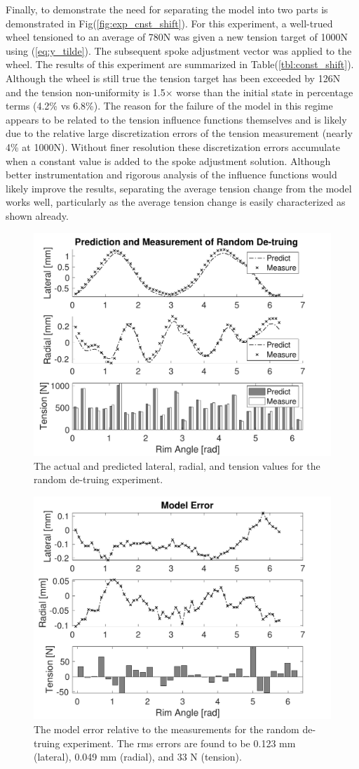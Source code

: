 \documentclass[journal]{IEEEtran}
\begin{document}
Finally, to demonstrate the need for separating the model into two parts is demonstrated in Fig(\ref{fig:exp_cnst_shift}).  For this experiment, a well-trued wheel tensioned to an average of 780N was given a new tension target of 1000N using (\ref{eq:y_tilde}).  The subsequent spoke adjustment vector was applied to the wheel.  The results of this experiment are summarized in Table(\ref{tbl:const_shift}).  Although the wheel is still true the tension target has been exceeded by 126N and the tension non-uniformity is 1.5$\times$ worse than the initial state in percentage terms (4.2\% vs 6.8\%). The reason for the failure of the model in this regime appears to be related to the tension influence functions themselves and is likely due to the relative large discretization errors of the tension measurement (nearly 4\% at 1000N).  Without finer resolution these discretization errors accumulate when a constant value is added to the spoke adjustment solution.  Although better instrumentation and rigorous analysis of the influence functions would likely improve the results, separating the average tension change from the model works well, particularly as the average tension change is easily characterized as shown already. 

\begin{figure}[!t]
\centering
\includegraphics[width=3.25 in]{./figs/exp1} %
\caption{The actual and predicted lateral, radial, and tension values for the random de-truing experiment.}
\label{fig:exp1}
\end{figure}

\begin{figure}[!t]
\centering
\includegraphics[width=3.25 in]{./figs/exp1_err} %
\caption{The model error relative to the measurements for the random de-truing experiment.  The rms errors are found to be 0.123 mm (lateral), 0.049 mm (radial), and 33 N (tension).}
\label{fig:exp1_err}
\end{figure}
\end{document}
